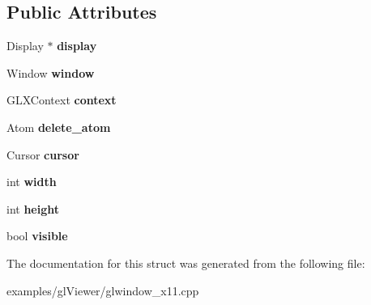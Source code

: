 \subsection*{Public Attributes}
\begin{DoxyCompactItemize}
\item 
\mbox{\label{struct_g_l_window_1_1_system_state_aeb17b154bf55aba75b2f807a2dac47f6}} 
Display $\ast$ {\bfseries display}
\item 
\mbox{\label{struct_g_l_window_1_1_system_state_aa2dff48b0d656cb10a97ce6eb7fbee56}} 
Window {\bfseries window}
\item 
\mbox{\label{struct_g_l_window_1_1_system_state_ab6ba4ef9e4aca634aad36b9e652e6c9f}} 
G\+L\+X\+Context {\bfseries context}
\item 
\mbox{\label{struct_g_l_window_1_1_system_state_a6901cb96188585fcf83cf46192ded4b1}} 
Atom {\bfseries delete\+\_\+atom}
\item 
\mbox{\label{struct_g_l_window_1_1_system_state_a8477bec2ff201a8dd407becfd0c104a1}} 
Cursor {\bfseries cursor}
\item 
\mbox{\label{struct_g_l_window_1_1_system_state_aae54ccdc33e813e058623555d182b963}} 
int {\bfseries width}
\item 
\mbox{\label{struct_g_l_window_1_1_system_state_a3ca4777d7371ae47f53a8dd69690e9c6}} 
int {\bfseries height}
\item 
\mbox{\label{struct_g_l_window_1_1_system_state_a7f931ca36a980cd9ff1c00dacf410dd2}} 
bool {\bfseries visible}
\end{DoxyCompactItemize}


The documentation for this struct was generated from the following file\+:\begin{DoxyCompactItemize}
\item 
examples/gl\+Viewer/glwindow\+\_\+x11.\+cpp\end{DoxyCompactItemize}
